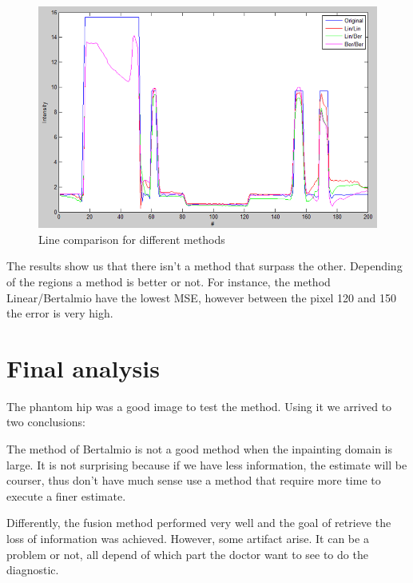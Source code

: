 \begin{figure}[H]
\centering	
\includegraphics[scale=0.6]{img/line_method}
\caption{{Line comparison for different methods}}\label{line_method}
\end{figure}

The results show us that there isn't a method that surpass the other. Depending of the regions a method is better or not. For instance, the method Linear/Bertalmio have the lowest MSE, however between the pixel 120 and 150 the error is very high.

\section{Final analysis}

The phantom hip was a good image to test the method. Using it we arrived to two conclusions:

The method of Bertalmio is not a good method when the inpainting domain is large. It is not surprising because if we have less information, the estimate will be courser, thus don't have much sense use a method that require more time to execute a finer estimate.

Differently, the fusion method performed very well and the goal of retrieve the loss of information was achieved. However, some artifact arise. It can be a problem or not, all depend of which part the doctor want to see to do the diagnostic.